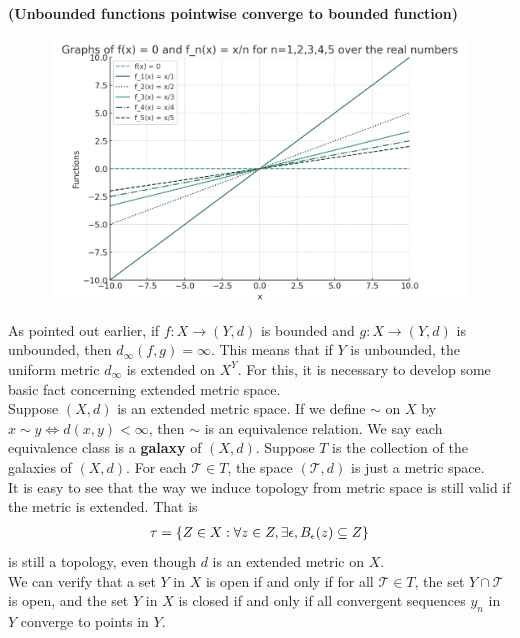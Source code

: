 \documentclass{report}
\begin{document}
\begin{mdframed}
\begin{Example}{\textbf{(Unbounded functions pointwise converge to bounded function)}}{}
\begin{center}
\begin{minipage}{0.9\linewidth}
       \centering  \includegraphics[height=7cm,width=15cm]{pwise converge2.png}
   \end{minipage}
\end{center}
\end{Example}
\end{mdframed} 
\begin{mdframed}
As pointed out earlier, if $f:X\rightarrow (Y,d)$ is bounded and $g:X\rightarrow (Y,d)$ is unbounded, then $d_{\infty}(f,g)=\infty$. This means that if $Y$ is unbounded, the uniform metric $d_{\infty}$ is extended on $X^Y$. For this, it is necessary to develop some basic fact concerning extended metric space.\\

Suppose $(X,d)$ is an extended metric space. If we define $\sim$ on $X$ by $x \sim y\iff  d(x,y)<\infty$, then $\sim $ is an equivalence relation. We say each equivalence class is a \textbf{galaxy} of $(X,d)$. Suppose $T$ is the collection of the galaxies of $(X,d)$. For each $\mathcal{T} \in T$, the space $(\mathcal{T},d)$ is just a metric space.\\

It is easy to see that the way we induce topology from metric space is still valid if the metric is extended. That is 
\begin{align*}
  \tau=\{ Z \in X: \forall z \in Z, \exists \epsilon ,B_\epsilon (z)\subseteq Z \}
\end{align*}
is still a topology, even though $d$ is an extended metric on $X$.\\

We can verify that a set $Y$ in $X$ is open if and only if for all  $\mathcal{T} \in T$, the set $Y \cap \mathcal{T}$ is open, and the set $Y$ in $X$ is closed if and only if all convergent sequences $y_n$ in  $Y$ converge to points in $Y$. \\
\end{mdframed}
\end{document}
